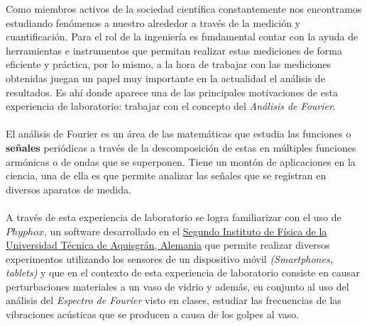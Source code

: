 \documentclass[letterpaper,11pt]{article} %
\begin{document}
	



\begin{resumen}

Como miembros activos de la sociedad científica constantemente nos encontramos estudiando fenómenos a nuestro alrededor a través de la medición y cuantificación. Para el rol de la ingeniería es fundamental contar con la ayuda de herramientas e instrumentos que permitan realizar estas mediciones de forma eficiente y práctica, por lo mismo, a la hora de trabajar con las mediciones obtenidas juegan un papel muy importante en la actualidad el análisis de resultados. Es ahí donde aparece una de las principales motivaciones de esta experiencia de laboratorio: trabajar con el concepto del \textit{Análisis de Fourier}.\\ \\
El análisis de Fourier es un área de las matemáticas que estudia las funciones o \textbf{señales} periódicas a través de la descomposición de estas en múltiples funciones armónicas o de ondas que se superponen. Tiene un montón de aplicaciones en la ciencia, una de ella es que permite analizar las señales que se registran en diversos aparatos de medida. \\ \\ 
A través de esta experiencia de laboratorio se logra familiarizar con el uso de $Phyphox$, un software desarrollado en el \href{https://es.wikipedia.org/wiki/Universidad_T\%C3\%A9cnica_de_Aquisgr\%C3\%A1n}{Segundo Instituto de Física de la Universidad Técnica de Aquisgrán, Alemania} que permite realizar diversos experimentos utilizando los sensores de un dispositivo móvil \textit{(Smartphones, tablets)} y que en el contexto de esta experiencia de laboratorio consiste en causar perturbaciones materiales a un vaso de vidrio y además, en conjunto al uso del análisis del \textit{Espectro de Fourier} visto en clases, estudiar las frecuencias de las vibraciones acústicas que se producen a causa de los golpes al vaso. \\ \\


\end{resumen}



\end{document}

